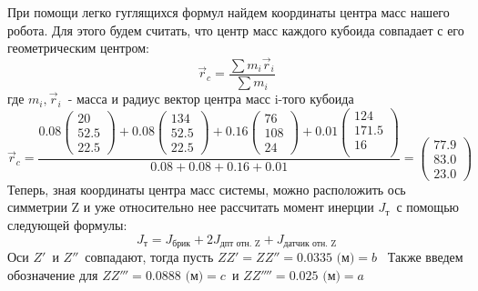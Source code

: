 \documentclass[a4paper]{article}
\begin{document}
\begin{flushleft}
\hfill \break
\hfill \break
При помощи легко гуглящихся формул найдем координаты центра масс нашего робота. Для этого будем считать, что центр масс каждого кубоида совпадает с его геометрическим центром:
\begin{equation*}
    \vec{r}_c = \frac{\sum m_i \vec{r}_i}{\sum m_i}
\end{equation*}
где \(m_{i}, \vec{r}_{i}\)\ - масса и радиус вектор центра масс i-того кубоида
\begin{equation*}
    \vec{r}_c = \frac{0.08\begin{pmatrix} 20\\52.5\\22.5 \end{pmatrix} + 0.08\begin{pmatrix} 134\\52.5\\22.5 \end{pmatrix} + 0.16\begin{pmatrix} 76\\108\\24 \end{pmatrix} + 0.01\begin{pmatrix} 124\\171.5\\16\\ \end{pmatrix}}{0.08+0.08+0.16+0.01} = \begin{pmatrix} 77.9\\83.0\\23.0 \end{pmatrix}
\end{equation*}
Теперь, зная координаты центра масс системы, можно расположить ось симметрии Z и уже относительно нее рассчитать момент инерции \(J_{\text{т}}\)\ с помощью следующей формулы:
\begin{equation}
    J_{\text{т}} = J_{\text{брик}} + 2J_{\text{дпт отн. Z}} + J_{\text{датчик отн. Z}} 
\end{equation}
Оси \(Z'\)\ и \(Z''\)\ совпадают, тогда пусть \(ZZ' = ZZ'' = 0.0335 \text{ (м)} =b\)\
\newline
Также введем обозначение для \(ZZ''' = 0.0888 \text{ (м)} = c \)\ и  \(ZZ'''' = 0.025 \text{ (м)}  =a \)\


\end{flushleft}
\end{document}
